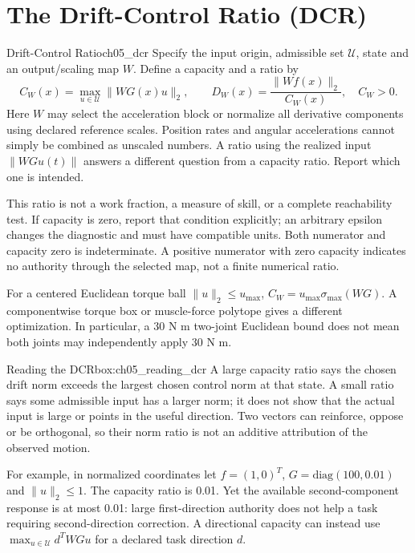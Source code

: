 \section{The Drift-Control Ratio (DCR)}
\begin{definition}{Drift-Control Ratio}{ch05_dcr}
Specify the input origin, admissible set $\mathcal U$, state and an output/scaling map $W$. Define a capacity and a ratio by
\begin{equation}
 C_W(x)=\max_{u\in\mathcal U}\|WG(x)u\|_2,\qquad
 D_W(x)=\frac{\|Wf(x)\|_2}{C_W(x)},\quad C_W>0.
\label{eq:ch05_dcr_def}
\end{equation}
Here $W$ may select the acceleration block or normalize all derivative components using declared reference scales. Position rates and angular accelerations cannot simply be combined as unscaled numbers. A ratio using the realized input $\|WG u(t)\|$ answers a different question from a capacity ratio. Report which one is intended.

This ratio is not a work fraction, a measure of skill, or a complete reachability test. If capacity is zero, report that condition explicitly; an arbitrary epsilon changes the diagnostic and must have compatible units. Both numerator and capacity zero is indeterminate. A positive numerator with zero capacity indicates no authority through the selected map, not a finite numerical ratio.
\end{definition}

For a centered Euclidean torque ball $\|u\|_2\le u_{\max}$, $C_W=u_{\max}\sigma_{\max}(WG)$. A componentwise torque box or muscle-force polytope gives a different optimization. In particular, a 30 N m two-joint Euclidean bound does not mean both joints may independently apply 30 N m.

\begin{laymansbox}{Reading the DCR}{box:ch05_reading_dcr}
A large capacity ratio says the chosen drift norm exceeds the largest chosen control norm at that state. A small ratio says some admissible input has a larger norm; it does not show that the actual input is large or points in the useful direction. Two vectors can reinforce, oppose or be orthogonal, so their norm ratio is not an additive attribution of the observed motion.

For example, in normalized coordinates let $f=(1,0)^T$, $G=\mathrm{diag}(100,0.01)$ and $\|u\|_2\le1$. The capacity ratio is 0.01. Yet the available second-component response is at most 0.01: large first-direction authority does not help a task requiring second-direction correction. A directional capacity can instead use $\max_{u\in\mathcal U} d^TWGu$ for a declared task direction $d$.
\end{laymansbox}

